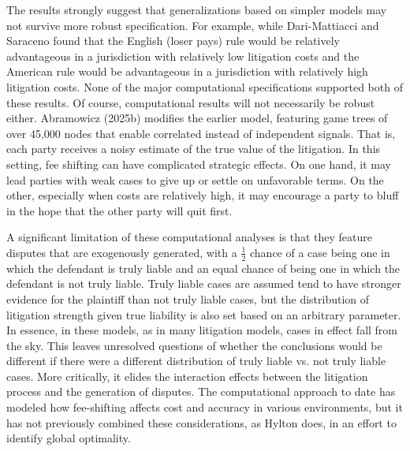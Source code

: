 \documentclass{article}
\begin{document}
The results strongly suggest that generalizations based on simpler models may not survive more robust specification. For example, while Dari-Mattiacci and Saraceno found that the English (loser pays) rule would be relatively advantageous in a jurisdiction with relatively low litigation costs and the American rule would be advantageous in a jurisdiction with relatively high litigation costs. None of the major computational specifications supported both of these results. Of course, computational results will not necessarily be robust either. Abramowicz (2025b) modifies the earlier model, featuring game trees of over 45,000 nodes that enable correlated instead of independent signals. That is, each party receives a noisy estimate of the true value of the litigation. In this setting, fee shifting can have complicated strategic effects. On one hand, it may lead parties with weak cases to give up or settle on unfavorable terms. On the other, especially when costs are relatively high, it may encourage a party to bluff in the hope that the other party will quit first. 

A significant limitation of these computational analyses is that they feature disputes that are exogenously generated, with a $\frac{1}{2}$ chance of a case being one in which the defendant is truly liable and an equal chance of being one in which the defendant is not truly liable. Truly liable cases are assumed tend to have stronger evidence for the plaintiff than not truly liable cases, but the distribution of litigation strength given true liability is also set based on an arbitrary parameter. In essence, in these models, as in many litigation models, cases in effect fall from the sky. This leaves unresolved questions of whether the conclusions would be different if there were a different distribution of truly liable vs. not truly liable cases. More critically, it elides the interaction effects between the litigation process and the generation of disputes. The computational approach to date has modeled how fee-shifting affects cost and accuracy in various environments, but it has not previously combined these considerations, as Hylton does, in an effort to identify global optimality.
\end{document}
